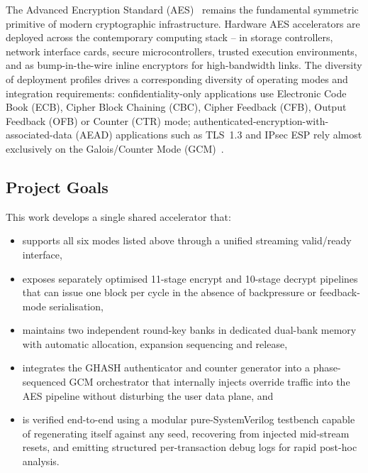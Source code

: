 \documentclass[conference,10pt,a4paper]{IEEEtran}
\begin{document}
The Advanced Encryption Standard (AES)~\cite{fips197} remains the
fundamental symmetric primitive of modern cryptographic infrastructure.
Hardware AES accelerators are deployed across the contemporary computing
stack -- in storage controllers, network interface cards, secure
microcontrollers, trusted execution environments, and as bump-in-the-wire
inline encryptors for high-bandwidth links.  The diversity of deployment
profiles drives a corresponding diversity of operating modes
\cite{sp80038a,sp80038d} and integration requirements: confidentiality-only
applications use Electronic Code Book (ECB), Cipher Block Chaining (CBC),
Cipher Feedback (CFB), Output Feedback (OFB) or Counter (CTR) mode;
authenticated-encryption-with-associated-data (AEAD) applications such as
TLS~1.3 and IPsec ESP rely almost exclusively on the Galois/Counter Mode
(GCM)~\cite{mcgrew-viega}.

\subsection{Project Goals}
This work develops a single shared accelerator that:
\begin{itemize}[leftmargin=*]
  \item supports all six modes listed above through a unified streaming
        valid/ready interface,
  \item exposes separately optimised 11-stage encrypt and 10-stage decrypt
        pipelines that can issue one block per cycle in the absence of
        backpressure or feedback-mode serialisation,
  \item maintains two independent round-key banks in dedicated dual-bank
        memory with automatic allocation, expansion sequencing and release,
  \item integrates the GHASH authenticator and counter generator into a
        phase-sequenced GCM orchestrator that internally injects override
        traffic into the AES pipeline without disturbing the user data
        plane, and
  \item is verified end-to-end using a modular pure-SystemVerilog testbench
        capable of regenerating itself against any seed, recovering from
        injected mid-stream resets, and emitting structured per-transaction
        debug logs for rapid post-hoc analysis.
\end{itemize}
\end{document}
